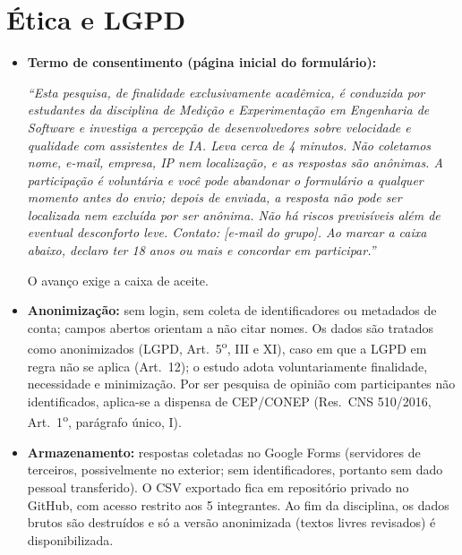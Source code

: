 \section{Ética e LGPD}

\begin{itemize}
  \item \textbf{Termo de consentimento (página inicial do formulário):}
  \begin{consentbox}
  \textit{\enquote{Esta pesquisa, de finalidade exclusivamente acadêmica, é conduzida por estudantes da disciplina de Medição e Experimentação em Engenharia de Software e investiga a percepção de desenvolvedores sobre velocidade e qualidade com assistentes de IA. Leva cerca de 4 minutos. Não coletamos nome, e-mail, empresa, IP nem localização, e as respostas são anônimas. A participação é voluntária e você pode abandonar o formulário a qualquer momento antes do envio; depois de enviada, a resposta não pode ser localizada nem excluída por ser anônima. Não há riscos previsíveis além de eventual desconforto leve. Contato: [e-mail do grupo]. Ao marcar a caixa abaixo, declaro ter 18 anos ou mais e concordar em participar.}}
  \end{consentbox}
  O avanço exige a caixa de aceite.
  \item \textbf{Anonimização:} sem login, sem coleta de identificadores ou metadados de conta; campos abertos orientam a não citar nomes. Os dados são tratados como anonimizados (LGPD, Art.\ 5\textsuperscript{o}, III e XI), caso em que a LGPD em regra não se aplica (Art.\ 12); o estudo adota voluntariamente finalidade, necessidade e minimização. Por ser pesquisa de opinião com participantes não identificados, aplica-se a dispensa de CEP/CONEP (Res.\ CNS 510/2016, Art.\ 1\textsuperscript{o}, parágrafo único, I).
  \item \textbf{Armazenamento:} respostas coletadas no Google Forms (servidores de terceiros, possivelmente no exterior; sem identificadores, portanto sem dado pessoal transferido). O CSV exportado fica em repositório privado no GitHub, com acesso restrito aos 5 integrantes. Ao fim da disciplina, os dados brutos são destruídos e só a versão anonimizada (textos livres revisados) é disponibilizada.
\end{itemize}
